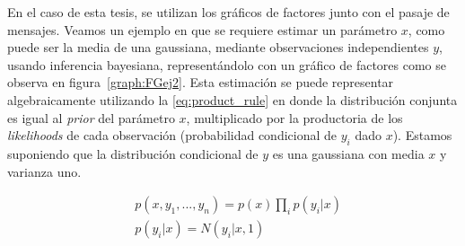 \documentclass[11pt,twoside,spanish]{report} %
\begin{document}
En el caso de esta tesis, se utilizan los gr\'aficos de factores junto con el pasaje de mensajes.
Veamos un ejemplo en que se requiere estimar un par\'ametro $x$, como puede ser la media de una gaussiana, mediante observaciones independientes $y$, usando inferencia bayesiana, represent\'andolo con un gr\'afico de factores como se observa en figura~\ref{graph:FGej2}. 
Esta estimaci\'on se puede representar algebraicamente utilizando la \ref{eq:product_rule} en donde la distribuci\'on conjunta es igual al \textit{prior} del par\'ametro $x$, multiplicado por la productoria de los \emph{likelihoods} de cada observaci\'on (probabilidad condicional de $y_i$ dado $x$).
Estamos suponiendo que la distribuci\'on condicional de $y$ es una gaussiana con media $x$ y varianza uno.



\begin{center}
	\begin{equation*}
	\begin{split}
	&p(x,y_1,...,y_n) = p(x)\prod_{i}p(y_i|x) \\
	&p(y_i|x) = N(y_i|x,1)
	\end{split}
	\end{equation*}
	\begin{figure}[H]
		\centering
\end{figure}
\end{center}
\end{document}
